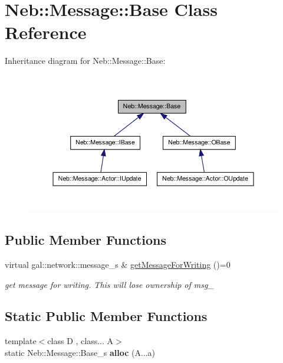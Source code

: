 \hypertarget{classNeb_1_1Message_1_1Base}{\section{\-Neb\-:\-:\-Message\-:\-:\-Base \-Class \-Reference}
\label{classNeb_1_1Message_1_1Base}
}


\-Inheritance diagram for \-Neb\-:\-:\-Message\-:\-:\-Base\-:\nopagebreak
\begin{figure}[H]
\begin{center}
\leavevmode
\includegraphics[width=350pt]{classNeb_1_1Message_1_1Base__inherit__graph}
\end{center}
\end{figure}
\subsection*{\-Public \-Member \-Functions}
\begin{DoxyCompactItemize}
\item 
\hypertarget{classNeb_1_1Message_1_1Base_ab48d95424c8cd0e6d49e2913065bd32a}{virtual gal\-::network\-::message\-\_\-s \& \hyperlink{classNeb_1_1Message_1_1Base_ab48d95424c8cd0e6d49e2913065bd32a}{get\-Message\-For\-Writing} ()=0}\label{classNeb_1_1Message_1_1Base_ab48d95424c8cd0e6d49e2913065bd32a}

\begin{DoxyCompactList}\small\item\em get message for writing. \-This will lose ownership of {\ttfamily msg\-\_\-} \end{DoxyCompactList}\end{DoxyCompactItemize}
\subsection*{\-Static \-Public \-Member \-Functions}
\begin{DoxyCompactItemize}
\item 
\hypertarget{classNeb_1_1Message_1_1Base_ad2336e4055a84d48220650b4ad8b2be9}{{\footnotesize template$<$class D , class... \-A$>$ }\\static \-Neb\-::\-Message\-::\-Base\-\_\-s {\bfseries alloc} (\-A...\-a)}\label{classNeb_1_1Message_1_1Base_ad2336e4055a84d48220650b4ad8b2be9}

\end{DoxyCompactItemize}
